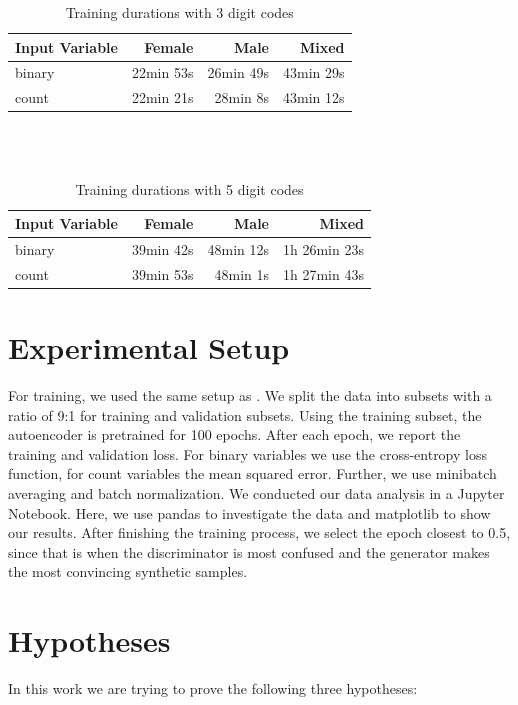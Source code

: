 \documentclass[11pt, a4paper, oneside]{book}
\begin{document}
\begin{table}
\begin{center}
\begin{tabularx}{\textwidth}{X|r|r|r}
Input Variable & Female & Male & Mixed \\
\hline
binary & 22min 53s & 26min 49s & 43min 29s\\
count & 22min 21s & 28min 8s & 43min 12s\\
\end{tabularx}
\caption{Training durations with 3 digit codes}
\end{center}
\end{table}
\\
\\
\begin{table}
\begin{center}
\begin{tabularx}{\textwidth}{X|r|r|r}
Input Variable & Female & Male & Mixed \\
\hline
binary & 39min 42s & 48min 12s & 1h 26min 23s\\
count & 39min 53s & 48min 1s & 1h 27min 43s\\
\end{tabularx}
\caption{Training durations with 5 digit codes}
\end{center}
\end{table}

\section{Experimental Setup}
 For training, we used the same setup as \citep{Choi2017}. We split the data into subsets with a ratio of 9:1 for training and validation subsets. Using the training subset, the autoencoder is pretrained for 100 epochs. 
 After each epoch, we report the training and validation loss. For binary variables we use the cross-entropy loss  function, for count variables the mean squared error.
 Further, we use minibatch averaging and batch normalization.
We conducted our data analysis in a Jupyter Notebook. Here, we use pandas to investigate the data and matplotlib to show our results.
After finishing the training process, we select the epoch closest to 0.5, since that is when the discriminator is most confused and the generator makes the most convincing synthetic samples.


\section{Hypotheses}
In this work we are trying to prove the following three hypotheses:
\end{document}
